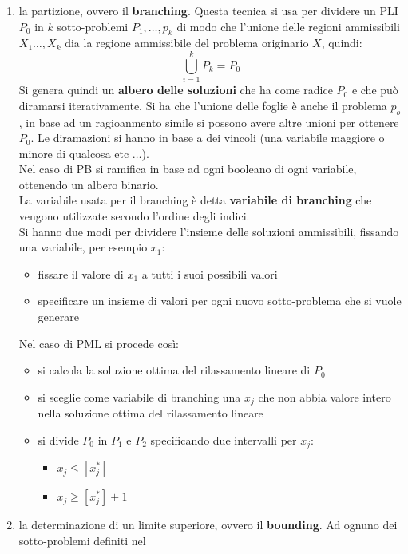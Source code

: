 \message{ !name(ro.tex)}\documentclass[a4paper,12pt, oneside]{book}
\begin{document}
\begin{enumerate}
  \item la partizione, ovvero il \textbf{branching}. Questa tecnica si
  usa per dividere un PLI $P_0$ in $k$ sotto-problemi $P_1,\ldots,
  p_k$ di modo che l'unione delle regioni ammissibili $X_1\ldots, X_k$
  dia la regione ammissibile del problema originario $X$, quindi:
  \[\bigcup_{i=1}^kP_k=P_0\]
  Si genera quindi un \textbf{albero delle soluzioni} che ha come
  radice $P_0$ e che può diramarsi iterativamente. Si ha che l'unione
  delle foglie è anche il problema $p_o$, in base ad un ragioanmento
  simile si possono avere altre unioni per ottenere $P_0$. Le
  diramazioni si hanno in base a dei vincoli (una variabile maggiore o
  minore di qualcosa etc $\ldots$).\\
  Nel caso di PB si ramifica in base ad ogni booleano di ogni
  variabile, ottenendo un albero binario.\\
  La variabile usata per il branching è detta \textbf{variabile di
    branching} che vengono utilizzate secondo l'ordine degli indici.\\
  Si hanno due modi per d:ividere l'insieme delle soluzioni
  ammissibili, fissando una variabile, per esempio $x_1$:
  \begin{itemize}
    \item fissare il valore di $x_1$ a tutti i suoi possibili valori
    \item specificare un insieme di valori per ogni nuovo sotto-problema
    che si vuole generare
  \end{itemize}
  Nel caso di PML si procede così:
  \begin{itemize}
    \item si calcola la soluzione ottima del rilassamento lineare di
    $P_0$
    \item si sceglie come variabile di branching una $x_j$ che non
    abbia valore intero nella soluzione ottima del rilassamento
    lineare
    \item si divide $P_0$ in $P_1$ e $P_2$ specificando due intervalli
    per $x_j$:
    \begin{itemize}
      \item $x_j\leq [x_j^*]$
      \item $x_j\geq [x_j^*]+1$
    \end{itemize}
  \end{itemize}
  \item la determinazione di un limite superiore, ovvero il
  \textbf{bounding}. Ad ognuno dei sotto-problemi definiti nel

\end{enumerate}
\end{document}
